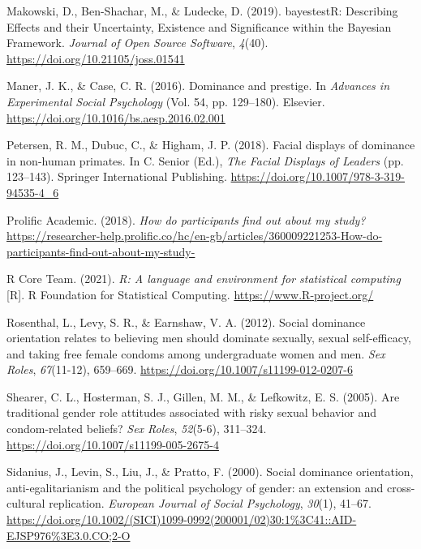\documentclass[
  donotrepeattitle,doc, 12pt, a4paper,floatsintext]{apa7}
\newlength{\cslhangindent}
\newlength{\cslentryspacingunit} %
\newenvironment{CSLReferences}[2] %
 {%
  \setlength{\parindent}{0pt}
  \ifodd #1
  \let\oldpar\par
  \def\par{\hangindent=\cslhangindent\oldpar}
  \fi
  \setlength{\parskip}{#2\cslentryspacingunit}
 }%
 {}
\begin{document}
\begin{CSLReferences}{1}{0}
\leavevmode{}%
Makowski, D., Ben-Shachar, M., \& Ludecke, D. (2019). bayestestR: Describing Effects and their Uncertainty, Existence and Significance within the Bayesian Framework. \emph{Journal of Open Source Software}, \emph{4}(40). \url{https://doi.org/10.21105/joss.01541}

\leavevmode{}%
Maner, J. K., \& Case, C. R. (2016). Dominance and prestige. In \emph{Advances in Experimental Social Psychology} (Vol. 54, pp. 129--180). Elsevier. \url{https://doi.org/10.1016/bs.aesp.2016.02.001}

\leavevmode{}%
Petersen, R. M., Dubuc, C., \& Higham, J. P. (2018). Facial displays of dominance in non-human primates. In C. Senior (Ed.), \emph{The Facial Displays of Leaders} (pp. 123--143). Springer International Publishing. \url{https://doi.org/10.1007/978-3-319-94535-4_6}

\leavevmode{}%
Prolific Academic. (2018). \emph{How do participants find out about my study?} \url{https://researcher-help.prolific.co/hc/en-gb/articles/360009221253-How-do-participants-find-out-about-my-study-}

\leavevmode{}%
R Core Team. (2021). \emph{R: A language and environment for statistical computing} {[}R{]}. R Foundation for Statistical Computing. \url{https://www.R-project.org/}

\leavevmode{}%
Rosenthal, L., Levy, S. R., \& Earnshaw, V. A. (2012). Social dominance orientation relates to believing men should dominate sexually, sexual self-efficacy, and taking free female condoms among undergraduate women and men. \emph{Sex Roles}, \emph{67}(11-12), 659--669. \url{https://doi.org/10.1007/s11199-012-0207-6}

\leavevmode{}%
Shearer, C. L., Hosterman, S. J., Gillen, M. M., \& Lefkowitz, E. S. (2005). Are traditional gender role attitudes associated with risky sexual behavior and condom-related beliefs? \emph{Sex Roles}, \emph{52}(5-6), 311--324. \url{https://doi.org/10.1007/s11199-005-2675-4}

\leavevmode{}%
Sidanius, J., Levin, S., Liu, J., \& Pratto, F. (2000). Social dominance orientation, anti-egalitarianism and the political psychology of gender: an extension and cross-cultural replication. \emph{European Journal of Social Psychology}, \emph{30}(1), 41--67. \url{https://doi.org/10.1002/(SICI)1099-0992(200001/02)30:1\%3C41::AID-EJSP976\%3E3.0.CO;2-O}


\end{CSLReferences}
\end{document}
